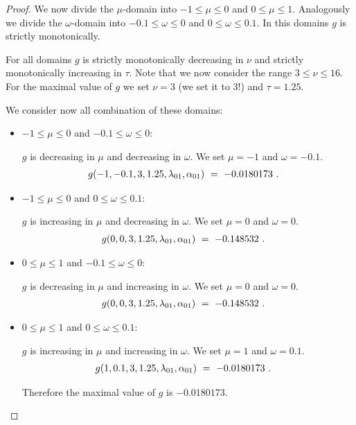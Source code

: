 \documentclass{article}
\renewcommand{\leq}{\leqslant}
\begin{document}
\begin{proof}
We now divide the $\mu$-domain into
$-1 \leq \mu \leq 0$ and $0 \leq \mu \leq 1$.
Analogously we divide the $\omega$-domain into
$-0.1 \leq \omega \leq 0$ and $0 \leq \omega \leq 0.1$.
In this domains $g$ is strictly monotonically.

For all domains
$g$ is strictly monotonically decreasing in $\nu$
and strictly monotonically increasing in $\tau$.
Note that we now consider the range  $3 \leq \nu \leq 16$.
For the maximal value of $g$ we set  $\nu=3$ (we set it to 3!)
and $\tau=1.25$.

We consider now all combination of these domains:
\begin{itemize}
\item $-1 \leq \mu \leq 0$ and $-0.1 \leq \omega \leq 0$:

$g$ is decreasing in  $\mu$ and decreasing in $\omega$.
We set  $\mu=-1$ and  $\omega=-0.1$.
\begin{align}
g(-1,-0.1,3,1.25,\lambda_{\rm 01},\alpha_{\rm 01})
\ &= \ -0.0180173 \ .
\end{align}

\item $-1 \leq \mu \leq 0$ and $0 \leq \omega \leq 0.1$:

$g$ is increasing in $\mu$ and decreasing in $\omega$.
We set  $\mu=0$ and  $\omega=0$.
\begin{align}
g(0,0,3,1.25,\lambda_{\rm 01},\alpha_{\rm 01})
\ &= \ -0.148532 \ .
\end{align}



\item $0 \leq \mu \leq 1$ and $-0.1 \leq \omega \leq 0$:

$g$ is decreasing in $\mu$ and increasing in $\omega$.
We set  $\mu=0$ and  $\omega=0$.
\begin{align}
g(0,0,3,1.25,\lambda_{\rm 01},\alpha_{\rm 01})
\ &= \ -0.148532 \ .
\end{align}

\item $0 \leq \mu \leq 1$ and $0 \leq \omega \leq 0.1$:

$g$ is increasing in $\mu$ and increasing in $\omega$.
We set  $\mu=1$ and  $\omega=0.1$.
\begin{align}
g(1,0.1,3,1.25,\lambda_{\rm 01},\alpha_{\rm 01})
\ &= \ -0.0180173 \ .
\end{align}

Therefore the maximal value of $g$ is  $-0.0180173$.
\end{itemize}


\end{proof}
\end{document}
